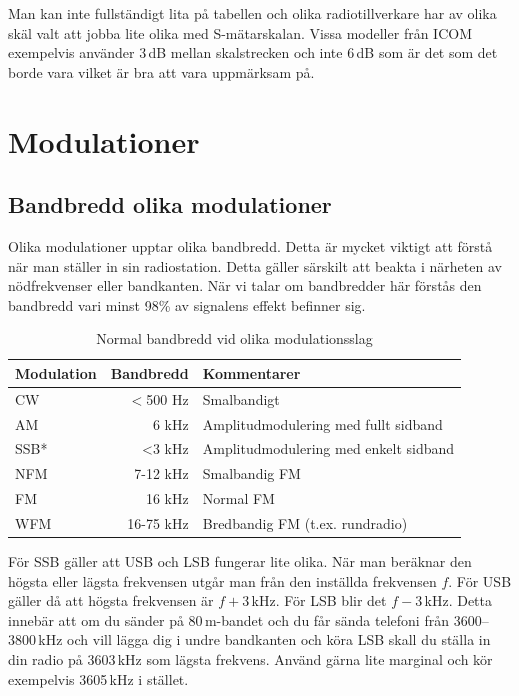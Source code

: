 Man kan inte fullständigt lita på tabellen och olika radiotillverkare har av
olika skäl valt att jobba lite olika med S-mätarskalan. Vissa modeller från
ICOM exempelvis använder 3\,dB mellan skalstrecken och inte 6\,dB som är det
som det borde vara vilket är bra att vara uppmärksam på.




\section{Modulationer}

\subsection{Bandbredd olika modulationer}

Olika modulationer upptar olika bandbredd. Detta är mycket viktigt att förstå
när man ställer in sin radiostation. Detta gäller särskilt att beakta i
närheten av nödfrekvenser eller bandkanten. När vi talar om bandbredder här
förstås den bandbredd vari minst 98\% av signalens effekt befinner sig.

\begin{table}[H]
\centering
\begin{tabular}{lrl}
	\textbf{Modulation} & \textbf{Bandbredd} & \textbf{Kommentarer}                  \\ \hline
	CW                  &          $<$500 Hz & Smalbandigt                           \\
	AM                  &              6 kHz & Amplitudmodulering med fullt sidband  \\
	SSB*                &              <3 kHz & Amplitudmodulering med enkelt sidband \\
	NFM                 &           7-12 kHz & Smalbandig FM                         \\
	FM                  &             16 kHz & Normal FM                             \\
	WFM                 &          16-75 kHz & Bredbandig FM (t.ex. rundradio)
\end{tabular}
\caption{Normal bandbredd vid olika modulationsslag}
\end{table}

För SSB gäller att USB och LSB fungerar lite olika. När man beräknar den
högsta eller lägsta frekvensen utgår man från den inställda frekvensen $f$.
För USB gäller då att högsta frekvensen är $f+3$\,kHz. För LSB blir det
$f-3$\,kHz. Detta innebär att om du sänder på 80\,m-bandet och du får sända
telefoni från 3600--3800\,kHz och vill lägga dig i undre bandkanten och köra
LSB skall du ställa in din radio på 3603\,kHz som lägsta frekvens. Använd
gärna lite marginal och kör exempelvis 3605\,kHz i stället.

